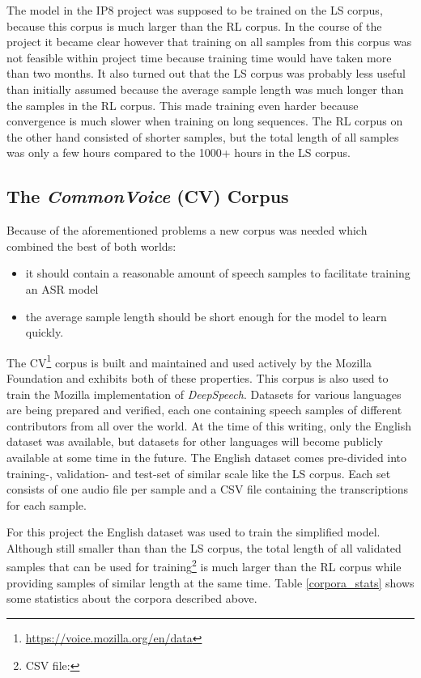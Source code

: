 The model in the IP8 project was supposed to be trained on the \ac{LS} corpus, because this corpus is much larger than the \ac{RL} corpus. In the course of the project it became clear however that training on all samples from this corpus was not feasible within project time because training time would have taken more than two months. It also turned out that the \ac{LS} corpus was probably less useful than initially assumed because the average sample length was much longer than the samples in the \ac{RL} corpus. This made training even harder because convergence is much slower when training on long sequences. The \ac{RL} corpus on the other hand consisted of shorter samples, but the total length of all samples was only a few hours compared to the 1000+ hours in the \ac{LS} corpus.

\subsection{The \textit{CommonVoice} (\ac{CV}) Corpus}

Because of the aforementioned problems a new corpus was needed which combined the best of both worlds:

\begin{itemize}
	\item it should contain a reasonable amount of speech samples to facilitate training an ASR model
	\item the average sample length should be short enough for the model to learn quickly.
\end{itemize}

The \ac{CV}\footnote{\url{https://voice.mozilla.org/en/data}} corpus is built and maintained and used actively by the Mozilla Foundation and exhibits both of these properties. This corpus is also used to train the Mozilla implementation of \textit{DeepSpeech}. Datasets for various languages are being prepared and verified, each one containing speech samples of different contributors from all over the world. At the time of this writing, only the English dataset was available, but datasets for other languages will become publicly available at some time in the future. The English dataset comes pre-divided into training-, validation- and test-set of similar scale like the \ac{LS} corpus. Each set consists of one audio file per sample and a CSV file containing the transcriptions for each sample.

For this project the English dataset was used to train the simplified model. Although still smaller than than the \ac{LS} corpus, the total length of all validated samples that can be used for training\footnote{CSV file: } is much larger than the \ac{RL} corpus while providing samples of similar length at the same time. Table \ref{corpora_stats} shows some statistics about the corpora described above.

